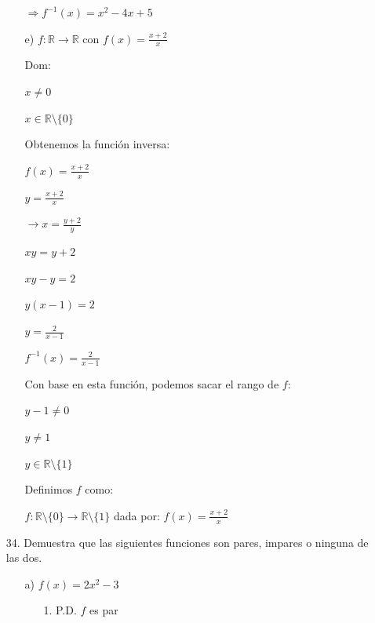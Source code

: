 \documentclass{article}
\begin{document}
\begin{enumerate}
\begin{enumerate}
        \(\Rightarrow f^{-1}(x) = x^2 - 4x + 5\)
        \vspace{\baselineskip}
        
        \item[e)] \(f : \mathbb{R} \rightarrow \mathbb{R} \text{ con } f(x) = \frac{x+2}{x}\)

        Dom:
        
        \(x \neq 0\)
        
        \(x \in \mathbb{R} \setminus \{0\}\)
        \vspace{\baselineskip}

        Obtenemos la función inversa:
        
        \(f(x) = \frac{x + 2}{x}\)
        
        \(y = \frac{x + 2}{x}\)
        \vspace{\baselineskip}
        
        \(\rightarrow x = \frac{y + 2}{y}\)
        
        \(xy = y + 2\)
        
        \(xy - y = 2\)
        
        \(y(x - 1) = 2\)
        
        \(y = \frac{2}{x - 1}\)
        \vspace{\baselineskip}
        
        \(f^{-1}(x) = \frac{2}{x - 1}\)
        \vspace{\baselineskip}
        
        Con base en esta función, podemos sacar el rango de \(f\):
        
        \(y - 1 \neq 0\)
        
        \(y \neq 1\)
        
        \(y \in \mathbb{R} \setminus \{1\}\)
        \vspace{\baselineskip}
        
        Definimos \(f\) como:
        
        \(f : \mathbb{R} \setminus \{0\} \rightarrow \mathbb{R} \setminus \{1\}\) dada por: \(f(x) = \frac{x + 2}{x}\)
    \end{enumerate}
    
\item[34.] Demuestra que las siguientes funciones son pares, impares o ninguna de las dos.
    \begin{enumerate}
        \item[a)] \(f(x) = 2x^2 - 3\)
            \begin{enumerate}
                \item[1.] P.D. \( f \) es par
                

\end{enumerate}
\end{enumerate}
\end{enumerate}
\end{document}
